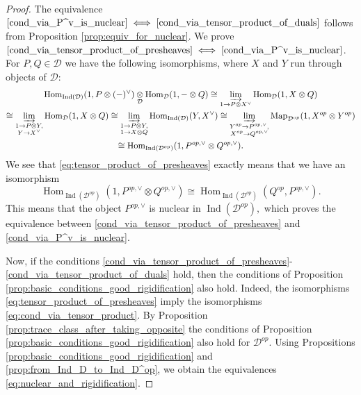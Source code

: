 \documentclass[11pt,leqno]{amsart}
\newcommand{\Iff}[2]{$\text{\ref{#1}}\iff\text{\ref{#2}}$}
\numberwithin{equation}{section}
\def\Hom{\operatorname{Hom}}
\def\Map{\operatorname{Map}}
\newcommand{\tens}[1]{%
  \mathbin{\mathop{\otimes}\displaylimits_{#1}}%
}
\newcommand{\indlim}[1][]{\mathop{\varinjlim}\limits_{#1}}
\newcommand{\cD}{{\mathcal D}}
\newcommand{\Ind}{\operatorname{Ind}}
\begin{document}
\begin{proof}
The equivalence \Iff{cond_via_P^v_is_nuclear}{cond_via_tensor_product_of_duals} follows from Proposition \ref{prop:equiv_for_nuclear}.
We prove \Iff{cond_via_tensor_product_of_presheaves}{cond_via_P^v_is_nuclear}. For $P,Q\in\cD$ we have the following isomorphisms, where $X$ and $Y$ run through objects of $\cD:$
\begin{multline*}
\Hom_{\Ind(\cD)}(1,P\otimes(-)^{\vee})\tens{\cD}\Hom_{\cD}(1,-\otimes Q)\cong \indlim[1\to P\otimes X^{\vee}]\Hom_{\cD}(1,X\otimes Q)\\
\cong \indlim[\substack{1\to P\otimes Y,\\ Y\to X^{\vee}}]\Hom_{\cD}(1,X\otimes Q)\cong\indlim[\substack{1\to P\otimes Y,\\ 1\to X\otimes Q}]\Hom_{\Ind(\cD)}(Y,X^{\vee})\cong \indlim[\substack{Y^{op}\to P^{op,\vee},\\ X^{op}\to Q^{op,\vee}}]\Map_{\cD^{op}}(1,X^{op}\otimes Y^{op})\\
\cong \Hom_{\Ind(\cD^{op})}(1,P^{op,\vee}\otimes Q^{op,\vee}).
\end{multline*}
We see that \eqref{eq:tensor_product_of_presheaves} exactly means that we have an isomorphism
\begin{equation*}
\Hom_{\Ind(\cD^{op})}(1,P^{op,\vee}\otimes Q^{op,\vee})\cong\Hom_{\Ind(\cD^{op})}(Q^{op},P^{op,\vee}).
\end{equation*}
This means that the object $P^{op,\vee}$ is nuclear in $\Ind(\cD^{op}),$ which proves the equivalence between \ref{cond_via_tensor_product_of_presheaves} and \ref{cond_via_P^v_is_nuclear}.

Now, if the conditions \ref{cond_via_tensor_product_of_presheaves}-\ref{cond_via_tensor_product_of_duals} hold, then the conditions of Proposition \ref{prop:basic_conditions_good_rigidification} also hold. Indeed, the isomorphisms \eqref{eq:tensor_product_of_presheaves} imply the isomorphisms \eqref{eq:cond_via_tensor_product}. 
By Proposition \ref{prop:trace_class_after_taking_opposite} the conditions of Proposition \ref{prop:basic_conditions_good_rigidification} also hold for $\cD^{op}.$ Using Propositions \ref{prop:basic_conditions_good_rigidification} and \ref{prop:from_Ind_D_to_Ind_D^op}, we obtain the equivalences \eqref{eq:nuclear_and_rigidification}.
\end{proof}
\end{document}
